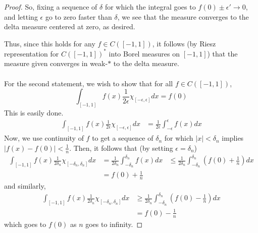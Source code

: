 \documentclass[fontsize=11pt]{scrartcl} %
\numberwithin{equation}{section} %
\numberwithin{figure}{section} %
\numberwithin{table}{section} %
\begin{document}
\begin{proof}
    So, fixing a sequence of $\delta$ for which the integral goes to
    $f(0)\pm\epsilon'\to 0$, and letting $\epsilon$ go to zero faster than
    $\delta$, we see that the measure converges to the delta measure centered at
    zero, as desired.
    
    Thus, since this holds for any $f\in C([-1,1])$, it follows (by Riesz
    representation for $C([-1,1])^*$ into Borel measures on $[-1,1]$) that the
    measure given converges in weak-$*$ to the delta measure.
    \\
    \\
    For the second statement, we wish to show that for all $f\in C([-1,1])$,
    \[
        \int_{[-1,1]}f(x)\frac{1}{2\epsilon}\chi_{[-\epsilon,\epsilon]}dx = f(0)
    \]
    This is easily done.
    \[
        \begin{aligned}
        \int_{[-1,1]}f(x)\frac{1}{2\epsilon}\chi_{[-\epsilon,\epsilon]}dx
            &= \frac{1}{2\epsilon}\int_{-\epsilon}^{\epsilon}f(x)dx
        \end{aligned}
    \]
    Now, we use continuity of $f$ to get a sequence of $\delta_n$ for which
    $|x|<\delta_n$ implies $|f(x)-f(0)|<\frac{1}{n}$. Then, it follows that (by
    setting $\epsilon = \delta_n$)
    \[
        \begin{aligned}
        \int_{[-1,1]}f(x)\frac{1}{2\delta_n}\chi_{[-\delta_n,\delta_n]}dx
            &= \frac{1}{2\delta_n}\int_{-\delta_n}^{\delta_n}f(x)dx
            &\leq
            \frac{1}{2\delta_n}\int_{-\delta_n}^{\delta_n}(f(0)+\frac{1}{n})dx\\
            &=f(0)+\frac{1}{n}
        \end{aligned}
    \]
    and similarly,
    \[
        \begin{aligned}
        \int_{[-1,1]}f(x)\frac{1}{2\delta_n}\chi_{[-\delta_n,\delta_n]}dx
            &\geq
            \frac{1}{2\delta_n}\int_{-\delta_n}^{\delta_n}(f(0)-\frac{1}{n})dx\\
            &=f(0)-\frac{1}{n}
        \end{aligned}
    \]
    which goes to $f(0)$ as $n$ goes to infinity.
\end{proof}
\end{document}

